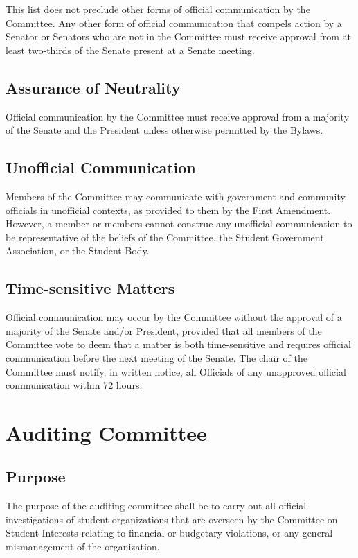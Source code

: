 \documentclass[12pt]{scrreprt}
\begin{document}
This list does not preclude other forms of official communication by the Committee. Any
other form of official communication that compels action by a Senator or Senators who
are not in the Committee must receive approval from at least two-thirds of the Senate
present at a Senate meeting.

\subsection{Assurance of Neutrality}
Official communication by the Committee must receive approval from a majority of the
Senate and the President unless otherwise permitted by the Bylaws.

\subsection{Unofficial Communication}
Members of the Committee may communicate with government and community officials
in unofficial contexts, as provided to them by the First Amendment. However, a member
or members cannot construe any unofficial communication to be representative of the
beliefs of the Committee, the Student Government Association, or the Student Body.

\subsection{Time-sensitive Matters}
Official communication may occur by the Committee without the approval of a majority
of the Senate and/or President, provided that all members of the Committee vote to
deem that a matter is both time-sensitive and requires official communication before the
next meeting of the Senate. The chair of the Committee must notify, in written notice, all
Officials of any unapproved official communication within 72 hours.

\section{Auditing Committee}
\subsection{Purpose}
The purpose of the auditing committee shall be to carry out all official
investigations of student organizations that are overseen by the Committee on
Student Interests relating to financial or budgetary violations, or any general
mismanagement of the organization.
\end{document}
